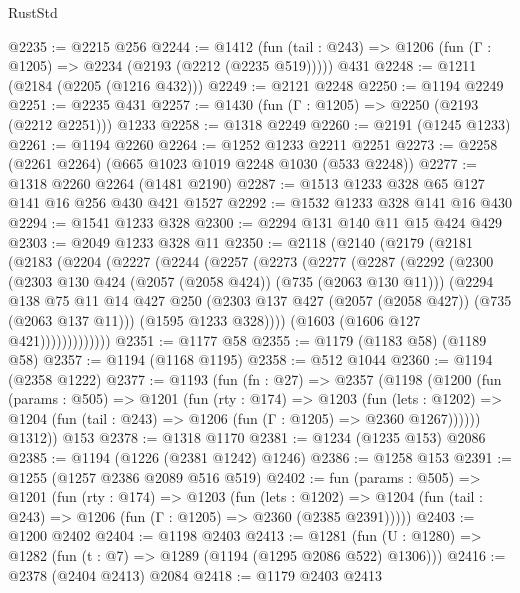 \begin{lexlean}{RustStd}
\begin{coremodule}
@2235 := @2215 @256
@2244 := @1412
    (fun (tail : @243) => @1206 (fun (Γ : @1205) => @2234 (@2193 (@2212 (@2235 @519)))))
    @431
@2248 := @1211 (@2184 (@2205 (@1216 @432)))
@2249 := @2121 @2248
@2250 := @1194 @2249
@2251 := @2235 @431
@2257 := @1430 (fun (Γ : @1205) => @2250 (@2193 (@2212 @2251))) @1233
@2258 := @1318 @2249
@2260 := @2191 (@1245 @1233)
@2261 := @1194 @2260
@2264 := @1252 @1233 @2211 @2251
@2273 := @2258 (@2261 @2264) (@665 @1023 @1019 @2248 @1030 (@533 @2248))
@2277 := @1318 @2260 @2264 (@1481 @2190)
@2287 := @1513 @1233 @328 @65 @127 @141 @16 @256 @430 @421 @1527
@2292 := @1532 @1233 @328 @141 @16 @430
@2294 := @1541 @1233 @328
@2300 := @2294 @131 @140 @11 @15 @424 @429
@2303 := @2049 @1233 @328 @11
@2350 := @2118
    (@2140
      (@2179
        (@2181
          (@2183
            (@2204
              (@2227
                (@2244
                  (@2257
                    (@2273
                      (@2277
                        (@2287
                          (@2292
                            (@2300
                              (@2303 @130 @424 (@2057 (@2058 @424)) (@735 (@2063 @130 @11)))
                              (@2294
                                @138
                                @75
                                @11
                                @14
                                @427
                                @250
                                (@2303 @137 @427 (@2057 (@2058 @427)) (@735 (@2063 @137 @11)))
                                (@1595 @1233 @328))))
                          (@1603 (@1606 @127 @421)))))))))))))
@2351 := @1177 @58
@2355 := @1179 (@1183 @58) (@1189 @58)
@2357 := @1194 (@1168 @1195)
@2358 := @512 @1044
@2360 := @1194 (@2358 @1222)
@2377 := @1193
    (fun (fn : @27) =>
    @2357
      (@1198
        (@1200
          (fun (params : @505) =>
          @1201
            (fun (rty : @174) =>
            @1203
              (fun (lets : @1202) =>
              @1204 (fun (tail : @243) => @1206 (fun (Γ : @1205) => @2360 @1267))))))
        @1312))
    @153
@2378 := @1318 @1170
@2381 := @1234 (@1235 @153) @2086
@2385 := @1194 (@1226 (@2381 @1242) @1246)
@2386 := @1258 @153
@2391 := @1255 (@1257 @2386 @2089 @516 @519)
@2402 := fun (params : @505) =>
  @1201
    (fun (rty : @174) =>
    @1203
      (fun (lets : @1202) =>
      @1204 (fun (tail : @243) => @1206 (fun (Γ : @1205) => @2360 (@2385 @2391)))))
@2403 := @1200 @2402
@2404 := @1198 @2403
@2413 := @1281 (fun (U : @1280) => @1282 (fun (t : @7) => @1289 (@1194 (@1295 @2086 @522) @1306)))
@2416 := @2378 (@2404 @2413) @2084
@2418 := @1179 @2403 @2413

\end{coremodule}
\end{lexlean}
